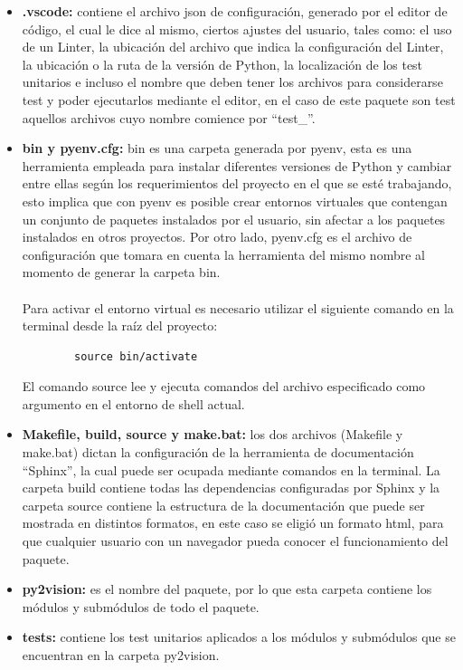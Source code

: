 \begin{itemize}
    \item \textbf{.vscode:} contiene el archivo json de configuración, generado por el editor de código, el cual le dice al mismo, ciertos ajustes del usuario, tales como: el uso de un Linter, la ubicación del archivo que indica la configuración del Linter, la ubicación o la ruta de la versión de Python, la localización de los test unitarios e incluso el nombre que deben tener los archivos para considerarse test y poder ejecutarlos mediante el editor, en el caso de este paquete son test aquellos archivos cuyo nombre comience por ``test\_''.
    \item \textbf{bin y pyenv.cfg:} bin es una carpeta generada por pyenv, esta es una herramienta empleada para instalar diferentes versiones de Python y cambiar entre ellas según los requerimientos del proyecto en el que se esté trabajando, esto implica que con pyenv es posible crear entornos virtuales que contengan un conjunto de paquetes instalados por el usuario, sin afectar a los paquetes instalados en otros proyectos. Por otro lado, pyenv.cfg es el archivo de configuración que tomara en cuenta la herramienta del mismo nombre al momento de generar la carpeta bin. 
    \\
    \\
    Para activar el entorno virtual es necesario utilizar el siguiente comando en la terminal desde la raíz del proyecto: 
    \begin{verbatim}
        source bin/activate
    \end{verbatim}
    El comando source lee y ejecuta comandos del archivo especificado como argumento en el entorno de shell actual.
    \item \textbf{Makefile, build, source y make.bat:} los dos archivos (Makefile y make.bat) dictan la configuración de la herramienta de documentación ``Sphinx'', la cual puede ser ocupada mediante comandos en la terminal. La carpeta build contiene todas las dependencias configuradas por Sphinx y la carpeta source contiene la estructura de la documentación que puede ser mostrada en distintos formatos, en este caso se eligió un formato html, para que cualquier usuario con un navegador pueda conocer el funcionamiento del paquete.
    \item \textbf{py2vision:} es el nombre del paquete, por lo que esta carpeta contiene los módulos y submódulos de todo el paquete.
    \item \textbf{tests:} contiene los test unitarios aplicados a los módulos y submódulos que se encuentran en la carpeta py2vision.

\end{itemize}
